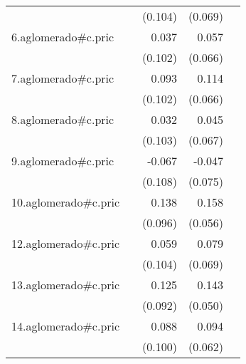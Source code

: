 {\begin{longtable}{l*{4}{D{.}{.}{-1}}}
            &                     &     (0.104)         &     (0.069)         &                     \\
\addlinespace
6.aglomerado#c.pric&                     &       0.037         &       0.057         &                     \\
            &                     &     (0.102)         &     (0.066)         &                     \\
\addlinespace
7.aglomerado#c.pric&                     &       0.093         &       0.114         &                     \\
            &                     &     (0.102)         &     (0.066)         &                     \\
\addlinespace
8.aglomerado#c.pric&                     &       0.032         &       0.045         &                     \\
            &                     &     (0.103)         &     (0.067)         &                     \\
\addlinespace
9.aglomerado#c.pric&                     &      -0.067         &      -0.047         &                     \\
            &                     &     (0.108)         &     (0.075)         &                     \\
\addlinespace
10.aglomerado#c.pric&                     &       0.138         &       0.158\sym{**} &                     \\
            &                     &     (0.096)         &     (0.056)         &                     \\
\addlinespace
12.aglomerado#c.pric&                     &       0.059         &       0.079         &                     \\
            &                     &     (0.104)         &     (0.069)         &                     \\
\addlinespace
13.aglomerado#c.pric&                     &       0.125         &       0.143\sym{**} &                     \\
            &                     &     (0.092)         &     (0.050)         &                     \\
\addlinespace
14.aglomerado#c.pric&                     &       0.088         &       0.094         &                     \\
            &                     &     (0.100)         &     (0.062)         &                     \\

\end{longtable}}
